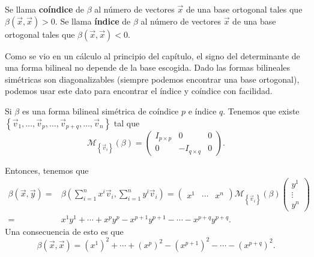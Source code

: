 \begin{fdefinition}
\normalfont Se llama \textbf{coíndice} de $\displaystyle \beta  $ al número de vectores $\displaystyle \vec{x} $ de una base ortogonal tales que $\displaystyle \beta\left(\vec{x}, \vec{x}\right) > 0 $. Se llama \textbf{índice} de $\displaystyle \beta  $ al número de vectores $\displaystyle \vec{x} $ de una base ortogonal tales que $\displaystyle \beta\left(\vec{x}, \vec{x}\right) < 0 $.
\end{fdefinition}
\begin{observation}
\normalfont Como se vio en un cálculo al principio del capítulo, el signo del determinante de una forma bilineal no depende de la base escogida. Dado las formas bilineales simétricas son diagonalizables (siempre podemos encontrar una base ortogonal), podemos usar este dato para encontrar el índice y coíndice con facilidad.
\end{observation}
\begin{observation}
	\normalfont Si $\displaystyle \beta  $ es una forma bilineal simétrica de coíndice $\displaystyle p $ e índice $\displaystyle q $. Tenemos que existe $\displaystyle \left\{ \vec{v}_{1}, \ldots, \vec{v}_{p}, \ldots, \vec{v}_{p +q}, \ldots, \vec{v}_{n}\right\}  $ tal que 
	\[\mathcal{M}_{ \left\{ \vec{v}_{i}\right\} }\left(\beta \right) = \begin{pmatrix} I_{p \times p} & 0 & 0 \\ 0 & - I_{q \times q} & 0\end{pmatrix} .\]
\end{observation}
Entonces, tenemos que 
\[
\begin{split}
	\beta\left(\vec{x}, \vec{y}\right)= & \beta\left(\sum^{n}_{i = 1}x^{i}\vec{v}_{i}, \sum^{n}_{i = 1}y^{i}\vec{v}_{i}\right) = \begin{pmatrix} x^{1} & \cdots & x^{n} \end{pmatrix} \mathcal{M}_{ \left\{ \vec{v}_{i}\right\} }\left(\beta \right) \begin{pmatrix} y^{1} \\ \vdots \\ y^{n} \end{pmatrix} \\
	= & x^{1}y^{1} + \cdots + x^{p}y^{p} - x^{p +1}y^{p +1} - \cdots - x^{p + q}y ^{p + q}.
\end{split}
\]
Una consecuencia de esto es que 
\[\beta\left(\vec{x}, \vec{x}\right) = \left(x^{1}\right)^{2} + \cdots + \left(x^{p}\right)^{2} - \left(x^{p + 1}\right)^{2} - \cdots - \left(x^{p + q}\right)^{2} .\]
